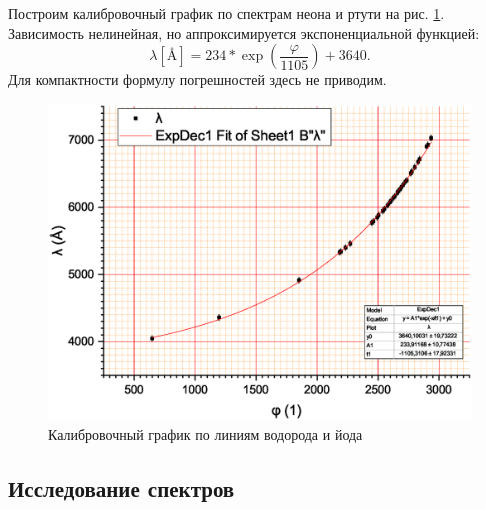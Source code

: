 \documentclass[a4paper]{article}
\renewcommand{\phi}{\varphi}
\newcommand{\angstrom}{\text{\AA}}
\begin{document}
	Построим калибровочный график по спектрам неона и ртути на рис. \ref{fig:graph1}. Зависимость нелинейная, но аппроксимируется экспоненциальной функцией:
	\begin{equation}\label{eq:calibre}
		\lambda\left[\angstrom\right] = 234*\exp \left(\dfrac{\phi}{1105}\right)+3640.
	\end{equation}
	Для компактности формулу погрешностей здесь не приводим.
	\begin{figure}[hb]
		\centering
		\includegraphics[width=0.8\linewidth]{Graph1}
		\caption{Калибровочный график по линиям водорода и йода}
		\label{fig:graph1}
	\end{figure}
	
	\subsection{Исследование спектров}
	
\end{document}
